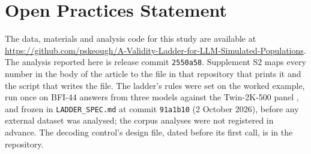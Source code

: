 \section*{Open Practices Statement}

The data, materials and analysis code for this study are available at \url{https://github.com/pskeough/A-Validity-Ladder-for-LLM-Simulated-Populations}. The analysis reported here is release commit \texttt{2550a58}. Supplement S2 maps every number in the body of the article to the file in that repository that prints it and the script that writes the file. The ladder's rules were set on the worked example, run once on BFI-44 answers from three models \citep{jiang2024personallm} against the Twin-2K-500 panel \citep{toubia2025twin2k}, and frozen in \texttt{LADDER\_SPEC.md} at commit \texttt{91a1b10} (2 October 2026), before any external dataset was analysed; the corpus analyses were not registered in advance. The decoding control's design file, dated before its first call, is in the repository.
